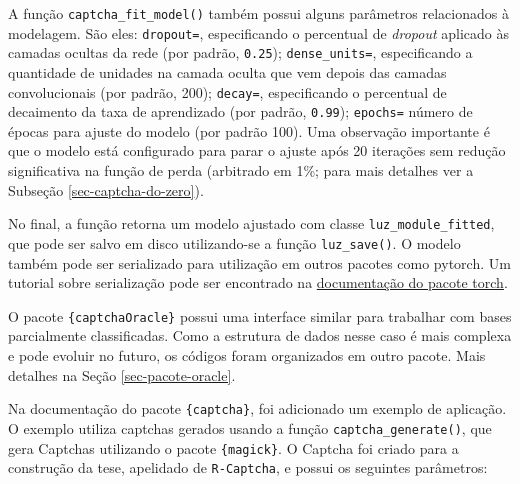 \documentclass[12pt,twoside,brazilian]{book}
\begin{document}
A função \texttt{captcha\_fit\_model()} também possui alguns parâmetros
relacionados à modelagem. São eles: \texttt{dropout=}, especificando o
percentual de \emph{dropout} aplicado às camadas ocultas da rede (por
padrão, \texttt{0.25}); \texttt{dense\_units=}, especificando a
quantidade de unidades na camada oculta que vem depois das camadas
convolucionais (por padrão, 200); \texttt{decay=}, especificando o
percentual de decaimento da taxa de aprendizado (por padrão,
\texttt{0.99}); \texttt{epochs=} número de épocas para ajuste do modelo
(por padrão 100). Uma observação importante é que o modelo está
configurado para parar o ajuste após 20 iterações sem redução
significativa na função de perda (arbitrado em 1\%; para mais detalhes
ver a Subseção \ref{sec-captcha-do-zero}).

No final, a função retorna um modelo ajustado com classe
\texttt{luz\_module\_fitted}, que pode ser salvo em disco utilizando-se
a função \texttt{luz\_save()}. O modelo também pode ser serializado para
utilização em outros pacotes como pytorch. Um tutorial sobre
serialização pode ser encontrado na
\href{https://torch.mlverse.org/docs/articles/serialization.html}{documentação
do pacote torch}.

O pacote \texttt{\{captchaOracle\}} possui uma interface similar para
trabalhar com bases parcialmente classificadas. Como a estrutura de
dados nesse caso é mais complexa e pode evoluir no futuro, os códigos
foram organizados em outro pacote. Mais detalhes na Seção
\ref{sec-pacote-oracle}.

Na documentação do pacote \texttt{\{captcha\}}, foi adicionado um
exemplo de aplicação. O exemplo utiliza captchas gerados usando a função
\texttt{captcha\_generate()}, que gera Captchas utilizando o pacote
\texttt{\{magick\}}. O Captcha foi criado para a construção da tese,
apelidado de \texttt{R-Captcha}, e possui os seguintes parâmetros:
\end{document}
